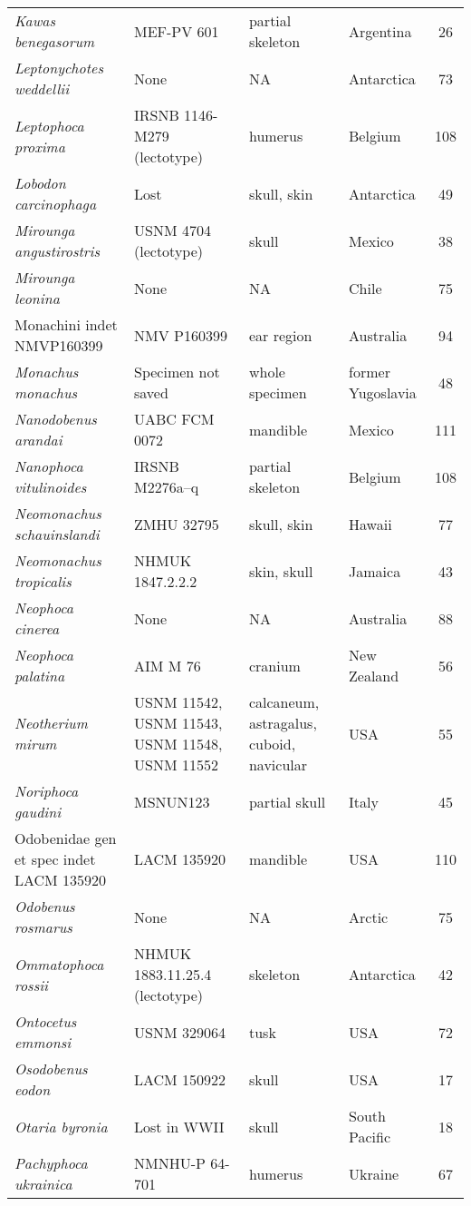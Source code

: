 \begin{longtable}{p{}p{}p{}lc}
\textit{Kawas benegasorum} &	MEF-PV 601 & 	partial skeleton & 	Argentina & 26\\
\textit{Leptonychotes weddellii} &	None & 	NA & 	Antarctica & 73\\
\textit{Leptophoca proxima} &	IRSNB 1146-M279 (lectotype) & 	humerus & 	Belgium & 108\\
\textit{Lobodon carcinophaga} &	Lost & 	skull, skin & 	Antarctica & 49\\
\textit{Mirounga angustirostris} &	USNM 4704 (lectotype) & 	skull & 	Mexico & 38\\
\textit{Mirounga leonina} &	None & 	NA & 	Chile & 75\\
Monachini indet NMVP160399	& NMV P160399 & 	ear region & 	Australia & 94\\
\textit{Monachus monachus} &	Specimen not saved & 	whole specimen & 	former Yugoslavia & 48\\
\textit{Nanodobenus arandai} &	UABC FCM 0072 & 	mandible & 	Mexico & 111\\
\textit{Nanophoca vitulinoides} &	IRSNB M2276a–q & 	partial skeleton & 	Belgium & 108\\
\textit{Neomonachus schauinslandi} &	ZMHU 32795 & 	skull, skin & 	Hawaii & 77\\
\textit{Neomonachus tropicalis} &	NHMUK 1847.2.2.2 & 	skin, skull & 	Jamaica & 43\\
\textit{Neophoca cinerea} &	None & 	NA & 	Australia & 88\\
\textit{Neophoca palatina} &	AIM M 76 & 	cranium & 	New Zealand & 56\\
\textit{Neotherium mirum} &	USNM 11542, USNM 11543, USNM 11548, USNM 11552 & calcaneum, astragalus, cuboid, navicular & 	USA & 55\\
\textit{Noriphoca gaudini} & MSNUN123 & 	partial skull & 	Italy & 45\\
Odobenidae gen et spec indet LACM 135920 &	LACM 135920 & 	mandible & 	USA & 110\\
\textit{Odobenus rosmarus} &	None & 	NA & 	Arctic & 75\\
\textit{Ommatophoca rossii} &	NHMUK 1883.11.25.4 (lectotype) & 	skeleton & 	Antarctica & 42\\
\textit{Ontocetus emmonsi} &	USNM 329064 & 	tusk & 	USA & 72\\
\textit{Osodobenus eodon} &	LACM 150922 & 	skull & 	USA & 17\\
\textit{Otaria byronia} &	Lost in WWII & 	skull & 	South Pacific & 18\\
\textit{Pachyphoca ukrainica} & NMNHU-P 64-701	& humerus	& Ukraine & 67\\

\end{longtable}
